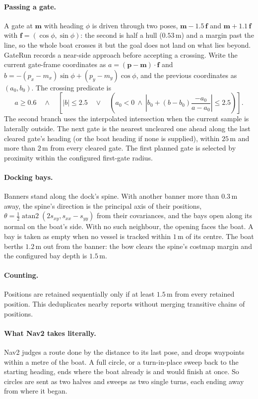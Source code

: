 \paragraph{Passing a gate.} A gate at $\bm m$ with heading $\phi$ is driven
through two poses, $\bm m - 1.5\,\bm f$ and $\bm m + 1.1\,\bm f$ with
$\bm f = (\cos\phi, \sin\phi)$: the second is half a hull ($0.53$\,m) and a margin
past the line, so the whole boat crosses it but the goal does not land on what
lies beyond. GateRun records a near-side approach before accepting a crossing. Write the
current gate-frame coordinates as $a=(\bm p-\bm m)\cdot\bm f$ and
$b=-(p_x-m_x)\sin\phi+(p_y-m_y)\cos\phi$, and the previous coordinates
as $(a_0,b_0)$. The crossing predicate is
\[
 a\ge0.6\quad\land\quad\left[|b|\le2.5\quad\lor\quad
 \left(a_0<0\ \land\ \left|b_0+(b-b_0)\frac{-a_0}{a-a_0}\right|\le2.5\right)\right].
\]
The second branch uses the interpolated intersection when the current sample
is laterally outside. The next gate is the nearest uncleared one ahead along
the last cleared gate's heading (or the boat heading if none is supplied),
within $25$\,m and more than $2$\,m from every cleared gate. The first planned
gate is selected by proximity within the configured first-gate radius.

\paragraph{Docking bays.} Banners stand along the dock's spine. With another banner more than $0.3$\,m away, the spine's direction is the principal axis of their positions,
$\theta = \tfrac12\operatorname{atan2}(2s_{xy}, s_{xx} - s_{yy})$ from their
covariances, and the bays open along its normal on the boat's side. With no such neighbour,
the opening faces the boat. A bay is
taken as empty when no vessel is tracked within $1$\,m of its centre. The boat
berths $1.2$\,m out from the banner: the bow clears the spine's costmap margin and
the configured bay depth is $1.5$\,m.

\paragraph{Counting.} Positions are retained sequentially only if at least $1.5$\,m
from every retained position. This deduplicates nearby reports without merging
transitive chains of positions.

\paragraph{What Nav2 takes literally.} Nav2 judges a route done by the distance to
its last pose, and drops waypoints within a metre of the boat. A full circle, or
a turn-in-place sweep back to the starting heading, ends where the boat already
is and would finish at once. So circles are sent as two halves and sweeps as two
single turns, each ending away from where it began.
